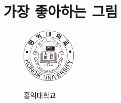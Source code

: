 \documentclass{article}
\begin{document}
\section{가장 좋아하는 그림}
\begin{figure}[H]
\begin{center}
		\includegraphics{Hongik.jpg}	
		\caption{홍익대학교}
		\label{fig:fig1}
	
			\label{fig:fig2}
\end{center}	
\begin{center}		
\end{center}
\begin{center}		
	

\end{center}
\end{figure}
\end{document}
